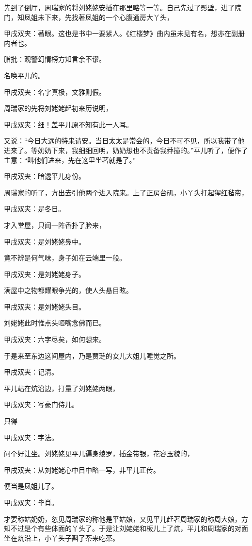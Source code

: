 \begin{parag}
    先到了倒厅，周瑞家的将刘姥姥安插在那里略等一等。自己先过了影壁，进了院门，知凤姐未下来，先找著凤姐的一个心腹通房大丫头，\begin{note}甲戌双夹：著眼。这也是书中一要紧人。《红楼梦》曲内虽未见有名，想亦在副册内者也。\end{note}\begin{note}脂批：观警幻情榜方知言余不谬。\end{note}名唤平儿的。\begin{note}甲戌双夹：名字真极，文雅则假。\end{note}周瑞家的先将刘姥姥起初来历说明，\begin{note}甲戌双夹：细！盖平儿原不知有此一人耳。\end{note}又说：“今日大远的特来请安。当日太太是常会的，今日不可不见，所以我带了他进来了。等奶奶下来，我细细回明，奶奶想也不责备我莽撞的。”平儿听了，便作了主意：“叫他们进来，先在这里坐著就是了。”\begin{note}甲戌双夹：暗透平儿身份。\end{note}周瑞家的听了，方出去引他两个进入院来。上了正房台矶，小丫头打起猩红毡帘，\begin{note}甲戌双夹：是冬日。\end{note}才入堂屋，只闻一阵香扑了脸来，\begin{note}甲戌双夹：是刘姥姥鼻中。 \end{note}竟不辨是何气味，身子如在云端里一般。\begin{note}甲戌双夹：是刘姥姥身子。 \end{note}满屋中之物都耀眼争光的，使人头悬目眩。\begin{note}甲戌双夹：是刘姥姥头目。\end{note}刘姥姥此时惟点头咂嘴念佛而已。\begin{note}甲戌双夹：六字尽矣，如何想来。\end{note}于是来至东边这间屋内，乃是贾琏的女儿大姐儿睡觉之所。\begin{note}甲戌双夹：记清。\end{note}平儿站在炕沿边，打量了刘姥姥两眼，\begin{note}甲戌双夹：写豪门侍儿。\end{note}只得\begin{note}甲戌双夹：字法。\end{note}问个好让坐。刘姥姥见平儿遍身绫罗，插金带银，花容玉貌的，\begin{note}甲戌双夹：从刘姥姥心中目中略一写，非平儿正传。 \end{note}便当是凤姐儿了。\begin{note}甲戌双夹：毕肖。\end{note}才要称姑奶奶，忽见周瑞家的称他是平姑娘，又见平儿赶著周瑞家的称周大娘，方知不过是个有些体面的丫头了。于是让刘姥姥和板儿上了炕，平儿和周瑞家的对面坐在炕沿上，小丫头子斟了茶来吃茶。
\end{parag}


